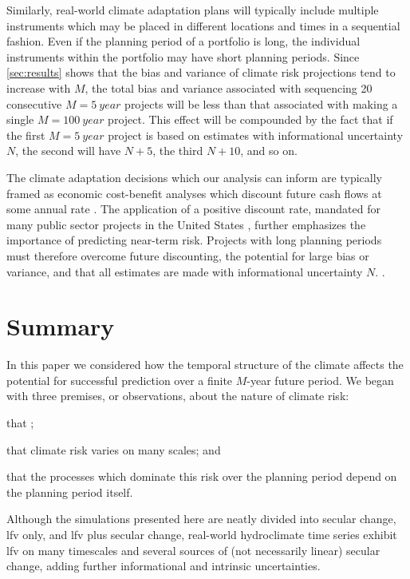 \documentclass[
  draft,
  linenumbers
]{agujournal2019}
\begin{document}
Similarly, real-world climate adaptation plans will typically include multiple instruments which may be placed in different locations and times in a sequential fashion.
Even if the planning period of a portfolio is long, the individual instruments within the portfolio may have short planning periods.
Since \cref{sec:results} shows that the bias and variance of climate risk projections tend to increase with $M$, the total bias and variance associated with sequencing 20 consecutive $M=\SI{5}{year}$ projects will be less than that associated with making a single $M=\SI{100}{year}$ project.
This effect will be compounded by the fact that if the first $M=\SI{5}{year}$ project is based on estimates with informational uncertainty $N$, the second will have $N+5$, the third $N+10$, and so on.

The climate adaptation decisions which our analysis can inform are typically framed as economic cost-benefit analyses which discount future cash flows at some annual rate \citep{sodastrom:1999,powers:2003}.
The application of a positive discount rate, mandated for many public sector projects in the United States \citep{powers:2003}, further emphasizes the importance of predicting near-term risk.
Projects with long planning periods must therefore overcome future discounting, the potential for large bias or variance, and that all estimates are made with informational uncertainty $N$.
.

\section{Summary}

In this paper we considered how the temporal structure of the climate affects the potential for successful prediction over a finite $M$-year future period.
We began with three premises, or observations, about the nature of climate risk:
\begin{enumerate*}[label= (\roman*)]
  \item that ;
  \item that climate risk varies on many scales; and
  \item that the processes which dominate this risk over the planning period depend on the planning period itself.
\end{enumerate*}
Although the simulations presented here are neatly divided into secular change, \gls{lfv} only, and \gls{lfv} plus secular change, real-world hydroclimate time series exhibit \gls{lfv} on many timescales and several sources of (not necessarily linear) secular change, adding further informational and intrinsic uncertainties.
\end{document}
